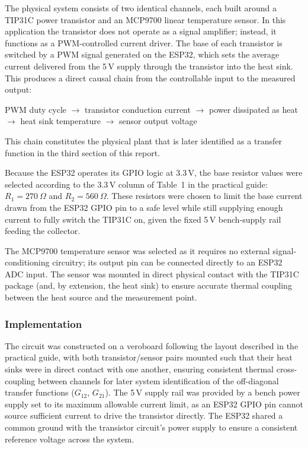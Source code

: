 The physical system consists of two identical channels, each built around a
TIP31C power transistor and an MCP9700 linear temperature sensor. In this
application the transistor does not operate as a signal amplifier; instead,
it functions as a PWM-controlled current driver. The base of each transistor
is switched by a PWM signal generated on the ESP32, which sets the average
current delivered from the 5\,V supply through the transistor into the heat
sink. This produces a direct causal chain from the controllable input to the
measured output:
\begin{center}
PWM duty cycle $\rightarrow$ transistor conduction current $\rightarrow$
power dissipated as heat $\rightarrow$ heat sink temperature
$\rightarrow$ sensor output voltage
\end{center}
This chain constitutes the physical plant that is later identified as a
transfer function in the third section of this report.

Because the ESP32 operates its GPIO logic at 3.3\,V, the base resistor
values were selected according to the 3.3\,V column of Table~1 in the
practical guide\cite{key}: $R_1 = 270\ \Omega$ and $R_2 = 560\ \Omega$. These
resistors were chosen to limit the base current drawn from the ESP32 GPIO
pin to a safe level while still supplying enough current to fully switch
the TIP31C on, given the fixed 5\,V bench-supply rail feeding the collector.

The MCP9700 temperature sensor was selected as it requires no external
signal-conditioning circuitry; its output pin can be connected directly to
an ESP32 ADC input. The sensor was mounted in direct physical contact with
the TIP31C package (and, by extension, the heat sink) to ensure accurate
thermal coupling between the heat source and the measurement point.

\subsubsection{Implementation}

The circuit was constructed on a veroboard following the layout described
in the practical guide, with both transistor/sensor pairs mounted such that
their heat sinks were in direct contact with one another, ensuring
consistent thermal cross-coupling between channels for later system
identification of the off-diagonal transfer functions ($G_{12}$,
$G_{21}$). The 5\,V supply rail was provided by a bench power supply set to
its maximum allowable current limit, as an ESP32 GPIO pin cannot source
sufficient current to drive the transistor directly. The ESP32 shared a
common ground with the transistor circuit's power supply to ensure a
consistent reference voltage across the system.

